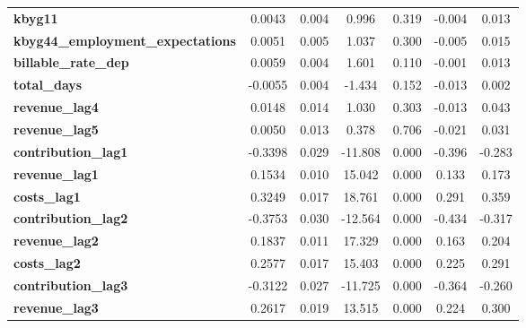 \begin{center}
\begin{tabular}{lcccccc}
\textbf{kbyg11}                             &       0.0043  &        0.004     &     0.996  &         0.319        &       -0.004    &        0.013     \\
\textbf{kbyg44\_employment\_expectations}   &       0.0051  &        0.005     &     1.037  &         0.300        &       -0.005    &        0.015     \\
\textbf{billable\_rate\_dep}                &       0.0059  &        0.004     &     1.601  &         0.110        &       -0.001    &        0.013     \\
\textbf{total\_days}                        &      -0.0055  &        0.004     &    -1.434  &         0.152        &       -0.013    &        0.002     \\
\textbf{revenue\_lag4}                      &       0.0148  &        0.014     &     1.030  &         0.303        &       -0.013    &        0.043     \\
\textbf{revenue\_lag5}                      &       0.0050  &        0.013     &     0.378  &         0.706        &       -0.021    &        0.031     \\
\textbf{contribution\_lag1}                 &      -0.3398  &        0.029     &   -11.808  &         0.000        &       -0.396    &       -0.283     \\
\textbf{revenue\_lag1}                      &       0.1534  &        0.010     &    15.042  &         0.000        &        0.133    &        0.173     \\
\textbf{costs\_lag1}                        &       0.3249  &        0.017     &    18.761  &         0.000        &        0.291    &        0.359     \\
\textbf{contribution\_lag2}                 &      -0.3753  &        0.030     &   -12.564  &         0.000        &       -0.434    &       -0.317     \\
\textbf{revenue\_lag2}                      &       0.1837  &        0.011     &    17.329  &         0.000        &        0.163    &        0.204     \\
\textbf{costs\_lag2}                        &       0.2577  &        0.017     &    15.403  &         0.000        &        0.225    &        0.291     \\
\textbf{contribution\_lag3}                 &      -0.3122  &        0.027     &   -11.725  &         0.000        &       -0.364    &       -0.260     \\
\textbf{revenue\_lag3}                      &       0.2617  &        0.019     &    13.515  &         0.000        &        0.224    &        0.300     \\

\end{tabular}
\end{center}
